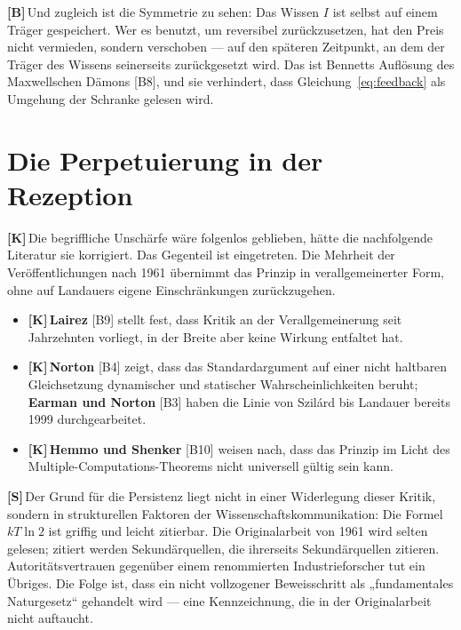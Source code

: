 \documentclass[11pt,a4paper]{article}
\newcommand{\LK}{\textcolor{layK}{\textbf{\footnotesize\textsf{[K]}}}\,}
\newcommand{\LB}{\textcolor{layB}{\textbf{\footnotesize\textsf{[B]}}}\,}
\newcommand{\LSk}{\textcolor{layS}{\textbf{\footnotesize\textsf{[S]}}}\,}
\theoremstyle{ffgft}
\begin{document}
\LB Und zugleich ist die Symmetrie zu sehen: Das Wissen $I$ ist selbst auf einem
Träger gespeichert. Wer es benutzt, um reversibel zurückzusetzen, hat den Preis
nicht vermieden, sondern verschoben --- auf den späteren Zeitpunkt, an dem der
Träger des Wissens seinerseits zurückgesetzt wird. Das ist Bennetts Auflösung des
Maxwellschen Dämons [B8], und sie verhindert, dass
Gleichung~\eqref{eq:feedback} als Umgehung der Schranke gelesen wird.

\section{Die Perpetuierung in der Rezeption}

\LK Die begriffliche Unschärfe wäre folgenlos geblieben, hätte die nachfolgende
Literatur sie korrigiert. Das Gegenteil ist eingetreten. Die Mehrheit der
Veröffentlichungen nach 1961 übernimmt das Prinzip in verallgemeinerter Form, ohne
auf Landauers eigene Einschränkungen zurückzugehen.

\begin{itemize}[leftmargin=1.4em,itemsep=0.3em]
  \item \LK \textbf{Lairez} [B9] stellt fest, dass Kritik an der Verallgemeinerung
        seit Jahrzehnten vorliegt, in der Breite aber keine Wirkung entfaltet hat.
  \item \LK \textbf{Norton} [B4] zeigt, dass das Standardargument auf einer nicht
        haltbaren Gleichsetzung dynamischer und statischer Wahrscheinlichkeiten
        beruht; \textbf{Earman und Norton} [B3] haben die Linie von Szilárd bis
        Landauer bereits 1999 durchgearbeitet.
  \item \LK \textbf{Hemmo und Shenker} [B10] weisen nach, dass das Prinzip im
        Licht des Multiple-Computations-Theorems nicht universell gültig sein kann.
\end{itemize}

\LSk Der Grund für die Persistenz liegt nicht in einer Widerlegung dieser Kritik,
sondern in strukturellen Faktoren der Wissenschaftskommunikation: Die Formel
$kT\ln 2$ ist griffig und leicht zitierbar. Die Originalarbeit von 1961 wird selten
gelesen; zitiert werden Sekundärquellen, die ihrerseits Sekundärquellen zitieren.
Autoritätsvertrauen gegenüber einem renommierten Industrieforscher tut ein
Übriges. Die Folge ist, dass ein nicht vollzogener Beweisschritt als
„fundamentales Naturgesetz“ gehandelt wird --- eine Kennzeichnung, die in der
Originalarbeit nicht auftaucht.
\end{document}
